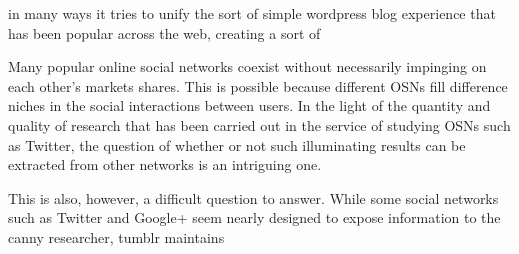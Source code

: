  in many ways it tries to unify 
the sort of simple wordpress blog experience that has been popular 
across the web, creating a sort of 



Many popular online social networks coexist without necessarily 
impinging on each other's markets shares.  This is possible because 
different OSNs fill difference niches in the social interactions 
between users.  In the light of the quantity and quality of research 
that has been carried out in the service of studying OSNs such as 
Twitter, the question of whether or not such illuminating results 
can be extracted from other networks is an intriguing one.  

This is also, however, a difficult question to answer.  While some 
social networks such as Twitter and Google+ seem nearly designed to 
expose information to the canny researcher, tumblr maintains 





